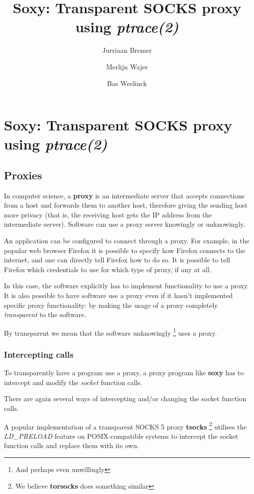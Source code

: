\documentclass[a4paper]{article}
\author{Jurriaan Bremer \and Merlijn Wajer \and Bas Weelinck}
\title{Soxy: Transparent SOCKS proxy using \textit{ptrace(2)}}
\begin{document}
\maketitle

\section{Soxy: Transparent SOCKS proxy using \textit{ptrace(2)}}

\subsection{Proxies}
In computer science, a \textbf{proxy} is an intermediate server that
accepts connections from a host and forwards them to another host,
therefore giving the sending host more privacy (that is, the
receiving host gets the IP address from the intermediate server).
Software can use a proxy server knowingly or unknowingly.

An application can be configured to connect through a proxy. For example, in
the popular web browser Firefox it is possible to specify how Firefox connects
to the internet, and one can directly tell Firefox how to do so.
It is possible to tell Firefox which credentials to use for which type of proxy,
if any at all.

In this case, the software explicitly has to implement functionality to use a
proxy. It is also possible to have software use a proxy even if it hasn't
implemented specific proxy functionality: by making the usage of a proxy
completely \textit{transparent} to the software.

By transparent we mean that the software unknowingly
\footnote{And perhaps even unwillingly} uses a proxy.

\subsubsection{Intercepting calls}

To transparently have a program use a proxy, a proxy program like \textbf{soxy}
has to intercept and modify the \textit{socket} function calls.

There are again several ways of intercepting and/or changing the socket function
calls.

A popular implementation of a transparent SOCKS 5 proxy \textbf{tsocks}
\footnote{We believe \textbf{torsocks} does something similar}
utilises the \textit{LD\_PRELOAD} feature on POSIX-compatible systems to
intercept the socket function calls and replace them with its own.
\end{document}
